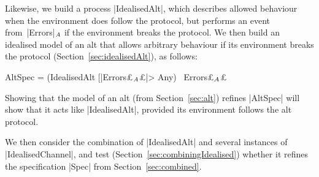 
Likewise, we build a process |IdealisedAlt|, which describes allowed behaviour
when the environment does follow the protocol, but performs an event
from~|Errors|$_A$ if the environment breaks the protocol.  We then
build an idealised model of an alt that allows arbitrary behaviour if its
environment breaks the protocol (Section~\ref{sec:idealisedAlt}), as follows:
%
\begin{cspm}
AltSpec = (IdealisedAlt [|Errors£$_A$£|> Any) \ Errors£$_A$£
\end{cspm}
%
Showing that the model of an alt (from Section~\ref{sec:alt}) refines
|AltSpec| will show that it acts like |IdealisedAlt|, provided its environment
follows the alt protocol.  
%

We then consider the combination of |IdealisedAlt| and several instances of
|IdealisedChannel|, and test (Section~\ref{sec:combiningIdealised}) whether it
refines the specification |Spec| from Section~\ref{sec:combined}.


